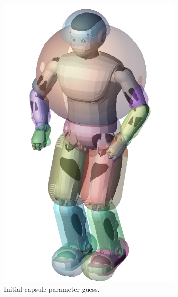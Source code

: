 \begin{figure}
\begin{subfigure}{0.24\columnwidth}
    \includegraphics[width = \columnwidth]
                    {src/chap3-optimal-motion-planning/figure/romeo-bounding-capsule.png}
    \caption{Initial capsule parameter guess.}
    \label{capsuleb}
  \end{subfigure}
  \begin{subfigure}{0.24\columnwidth}
    \centering

\end{subfigure}
\end{figure}
